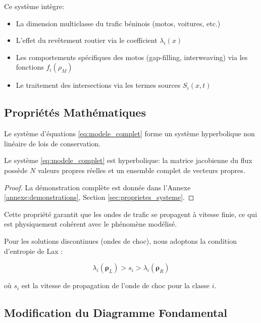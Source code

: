Ce système intègre:
\begin{itemize}
\item La dimension multiclasse du trafic béninois (motos, voitures, etc.)
\item L'effet du revêtement routier via le coefficient $\lambda_i(x)$
\item Les comportements spécifiques des motos (gap-filling, interweaving) via les fonctions $f_i(\rho_M)$
\item Le traitement des intersections via les termes sources $S_i(x,t)$
\end{itemize}

\subsection{Propriétés Mathématiques}
\label{subsec:proprietes_mathematiques}

Le système d'équations \eqref{eq:modele_complet} forme un système hyperbolique non linéaire de lois de conservation.

\begin{theorem}
Le système \eqref{eq:modele_complet} est hyperbolique: la matrice jacobienne du flux possède $N$ valeurs propres réelles et un ensemble complet de vecteurs propres.
\end{theorem}

\begin{proof}
La démonstration complète est donnée dans l'Annexe \ref{annexe:demonstrations}, Section \ref{sec:proprietes_systeme}.
\end{proof}

Cette propriété garantit que les ondes de trafic se propagent à vitesse finie, ce qui est physiquement cohérent avec le phénomène modélisé.

Pour les solutions discontinues (ondes de choc), nous adoptons la condition d'entropie de Lax \cite{lax1973hyperbolic}:

\begin{equation}
\lambda_i(\boldsymbol{\rho}_L) > s_i > \lambda_i(\boldsymbol{\rho}_R)
\label{eq:condition_entropie}
\end{equation}

où $s_i$ est la vitesse de propagation de l'onde de choc pour la classe $i$.

\subsection{Modification du Diagramme Fondamental}
\label{subsec:modification_diagramme}

